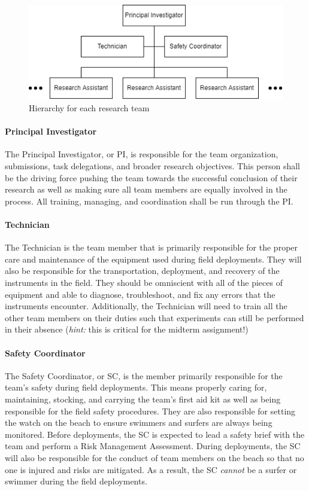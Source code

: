 \documentclass[
	letterpaper, %
	fontsize=10pt, %
	twoside=true, %
	numbers=noenddot, %
]{kaobook}
\begin{document}
\begin{figure}
    \caption{Hierarchy for each research team}
    \includegraphics[width=5.0in]{team_structure.png}
\end{figure}

\paragraph*{Principal Investigator} The Principal Investigator, or PI, is responsible for the team organization, submissions, task delegations, and broader research objectives.
This person shall be the driving force pushing the team towards the successful conclusion of their research as well as making sure all team members are equally involved in the process.
All training, managing, and coordination shall be run through the PI.

\paragraph*{Technician} The Technician is the team member that is primarily responsible for the proper care and maintenance of the equipment used during field deployments.
They will also be responsible for the transportation, deployment, and recovery of the instruments in the field.
They should be omniscient with all of the pieces of equipment and able to diagnose, troubleshoot, and fix any errors that the instruments encounter.
Additionally, the Technician will need to train all the other team members on their duties such that experiments can still be performed in their absence (\emph{hint:} this is critical for the midterm assignment!)

\paragraph*{Safety Coordinator} The Safety Coordinator, or SC, is the member primarily responsible for the team's safety during field deployments.
This means properly caring for, maintaining, stocking, and carrying the team's first aid kit as well as being responsible for the field safety procedures.
They are also responsible for setting the watch on the beach to ensure swimmers and surfers are always being monitored.
Before deployments, the SC is expected to lead a safety brief with the team and perform a Risk Management Assessment.
During deployments, the SC will also be responsible for the conduct of team members on the beach so that no one is injured and risks are mitigated.
As a result, the SC \emph{cannot} be a surfer or swimmer during the field deployments.
\end{document}
